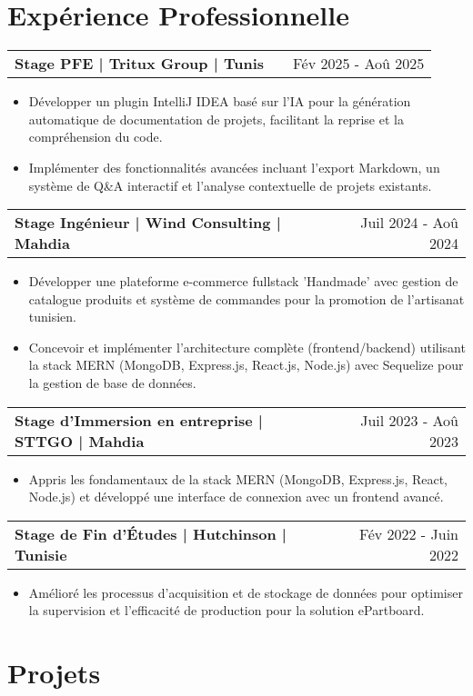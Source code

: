 \documentclass[a4paper,11pt]{article}
\makeatletter
\newenvironment{jobshort}[2]
    {
    \begin{tabularx}{\linewidth}{@{}l X r@{}}
    \textbf{#1} & \hfill &  #2 \\[2.75pt]
    \end{tabularx}
    \begin{minipage}[t]{\linewidth}
    \begin{itemize}[nosep,after=\strut, leftmargin=1em, itemsep=2pt]
    }
    {
    \end{itemize}
    \end{minipage}
    }
\makeatother
\begin{document}
\section{Expérience Professionnelle}

\begin{jobshort}{Stage PFE | Tritux Group | Tunis}{Fév 2025 - Aoû 2025}
\item Développer un plugin IntelliJ IDEA basé sur l'IA pour la génération automatique de documentation de projets, facilitant la reprise et la compréhension du code.
\item Implémenter des fonctionnalités avancées incluant l'export Markdown, un système de Q\&A interactif et l'analyse contextuelle de projets existants.
\end{jobshort}

\begin{jobshort}{Stage Ingénieur | Wind Consulting | Mahdia}{Juil 2024 - Aoû 2024}
\item Développer une plateforme e-commerce fullstack 'Handmade' avec gestion de catalogue produits et système de commandes pour la promotion de l'artisanat tunisien.
\item Concevoir et implémenter l'architecture complète (frontend/backend) utilisant la stack MERN (MongoDB, Express.js, React.js, Node.js) avec Sequelize pour la gestion de base de données.
\end{jobshort}

\begin{jobshort}{Stage d'Immersion en entreprise | STTGO | Mahdia}{Juil 2023 - Aoû 2023}
\item Appris les fondamentaux de la stack MERN (MongoDB, Express.js, React, Node.js) et développé une interface de connexion avec un frontend avancé.
\end{jobshort}

\begin{jobshort}{Stage de Fin d'Études | Hutchinson | Tunisie}{Fév 2022 - Juin 2022}
\item Amélioré les processus d'acquisition et de stockage de données pour optimiser la supervision et l'efficacité de production pour la solution ePartboard.
\end{jobshort}
  
\section{Projets}
\end{document}
